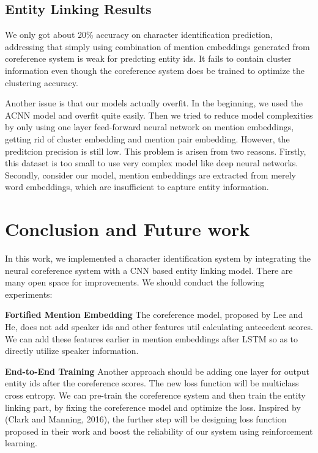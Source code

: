 \documentclass[11pt]{article}
\begin{document}
\subsection{Entity Linking Results}
We only got about 20\% accuracy on character identification prediction, addressing that simply using combination of mention embeddings generated from coreference system is weak for predcting entity ids. It fails to contain cluster information even though the coreference system does be trained to optimize the clustering accuracy. 

Another issue is that our models actually overfit. In the beginning, we used the ACNN model and overfit quite easily. Then we tried to reduce model complexities by only using one layer feed-forward neural network on mention embeddings, getting rid of cluster embedding and mention pair embedding. However, the preditcion precision is still low. This problem is arisen from two reasons. Firstly, this dataset is too small to use very complex model like deep neural networks. Secondly, consider our model, mention embeddings are extracted from merely word embeddings, which are insufficient to capture entity information.

\section{Conclusion and Future work}

In this work, we implemented a character identification system by integrating the neural coreference system with a CNN based entity linking model. There are many open space for improvements. We should conduct the following experiments:

{\bf Fortified Mention Embedding} 
The coreference model, proposed by Lee and He, does not add speaker ids and other features util calculating antecedent scores. We can add these features earlier in mention embeddings after LSTM so as to directly utilize speaker information.   

{\bf End-to-End Training}
Another approach should be adding one layer for output entity ids after the coreference scores. The new loss function will be multiclass cross entropy. We can pre-train the coreference system and then train the entity linking part, by fixing the coreference model and optimize the loss. Inspired by (Clark and Manning, 2016), the further step will be designing loss function proposed in their work and boost the reliability of our system using reinforcement learning.
\end{document}
